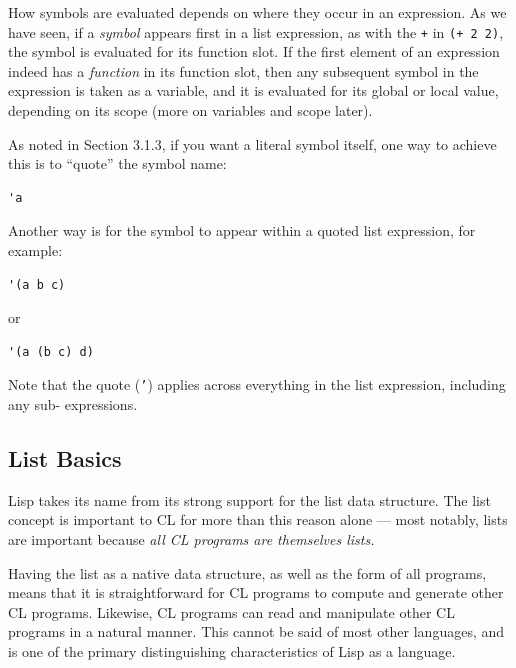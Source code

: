 \documentclass [11pt]{book}
\begin{document}
How symbols are evaluated depends on where they occur in an
expression. As we have seen, if a \emph{symbol} appears first in a list expression, as with the \texttt{+} in \texttt{(+ 2 2)}, the symbol is evaluated for its function slot. If the first 
element of an expression indeed has a \emph{function} in its function slot, then any 
subsequent symbol in the expression is taken as a variable, and it is evaluated 
for its global or local value, depending on its scope (more on variables and 
scope later).



As noted in Section 3.1.3, if you want a literal symbol itself, one
way to achieve this is to ``quote'' the symbol name:

\begin{verbatim}'a
\end{verbatim}



Another way is for the symbol to appear within a quoted list expression, for example:

\begin{verbatim}'(a b c)
\end{verbatim} or 

\begin{verbatim}'(a (b c) d)
\end{verbatim}



Note that the quote (\texttt{'}) applies across everything in the list expression, including any sub- expressions.



\subsection{List Basics}

\label{subsec:listbasics}



Lisp takes its name from its strong support for the list data
structure. The list concept is important to CL for more than this
reason alone --- most notably, lists are important because \emph{all CL programs are themselves lists.}



 Having the list as a native data structure, as well as the form of all
programs, means that it is straightforward for CL programs to compute
and generate other CL programs. Likewise, CL programs can read and
manipulate other CL programs in a natural manner. This cannot be said
of most other languages, and is one of the primary distinguishing
characteristics of Lisp as a language.
\end{document}
